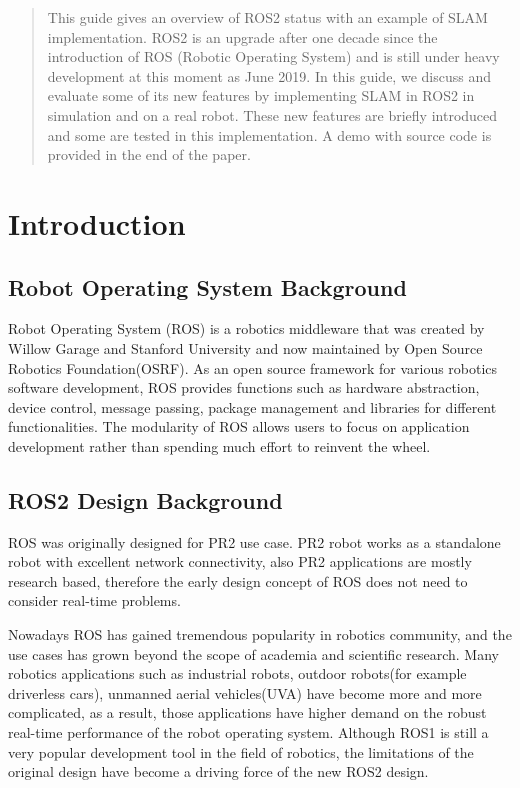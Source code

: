 \documentclass[12pt]{article}
\begin{document}
\maketitle

\begin{abstract}
 This guide gives an overview of ROS2 status with an example of SLAM implementation. ROS2 is an upgrade after one decade since the introduction of ROS (Robotic Operating System) and is still under heavy development at this moment as June 2019. In this guide, we discuss and evaluate some of its new features by implementing SLAM in ROS2 in simulation and on a real robot. These new features are briefly introduced and some are tested in this implementation. A demo with source code is provided in the end of the paper.
\end{abstract}

\section{Introduction}
\subsection{Robot Operating System Background}
Robot Operating System (ROS) is a robotics middleware that was created by Willow Garage and Stanford University and now maintained by Open Source Robotics Foundation(OSRF).  As an open source framework for various robotics software development, ROS provides functions such as hardware abstraction, device control, message passing, package management and libraries for different functionalities. The modularity of ROS allows users to focus on application development rather than spending much effort to reinvent the wheel.

\subsection{ROS2 Design Background}
ROS was originally designed for PR2 use case. PR2 robot works as a standalone robot with excellent network connectivity, also PR2 applications are mostly research based, therefore the early design concept of ROS does not need to consider real-time problems.

Nowadays ROS has gained tremendous popularity in robotics community, and the use cases has grown beyond the scope of academia and scientific research. Many robotics applications such as  industrial robots, outdoor robots(for example driverless cars), unmanned aerial vehicles(UVA) have become more and more complicated, as a result, those applications have higher demand on the robust real-time performance of the robot operating system. Although ROS1 is still a very popular development tool in the field of robotics, the limitations of the original design have become a driving force of the new ROS2 design. 
\end{document}
